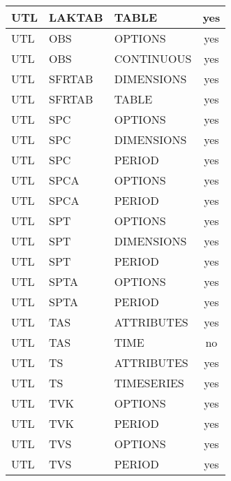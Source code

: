 \begin{longtable}{p{1.5cm} p{1.5cm} p{3cm} c}
UTL & LAKTAB & TABLE & yes \\ 
\hline
UTL & OBS & OPTIONS & yes \\ 
UTL & OBS & CONTINUOUS & yes \\ 
\hline
UTL & SFRTAB & DIMENSIONS & yes \\ 
UTL & SFRTAB & TABLE & yes \\ 
\hline
UTL & SPC & OPTIONS & yes \\ 
UTL & SPC & DIMENSIONS & yes \\ 
UTL & SPC & PERIOD & yes \\ 
\hline
UTL & SPCA & OPTIONS & yes \\ 
UTL & SPCA & PERIOD & yes \\ 
\hline
UTL & SPT & OPTIONS & yes \\ 
UTL & SPT & DIMENSIONS & yes \\ 
UTL & SPT & PERIOD & yes \\ 
\hline
UTL & SPTA & OPTIONS & yes \\ 
UTL & SPTA & PERIOD & yes \\ 
\hline
UTL & TAS & ATTRIBUTES & yes \\ 
UTL & TAS & TIME & no \\ 
\hline
UTL & TS & ATTRIBUTES & yes \\ 
UTL & TS & TIMESERIES & yes \\ 
\hline
UTL & TVK & OPTIONS & yes \\ 
UTL & TVK & PERIOD & yes \\ 
\hline
UTL & TVS & OPTIONS & yes \\ 
UTL & TVS & PERIOD & yes \\ 


\hline
\end{longtable}
\label{table:blocks}
\normalsize
